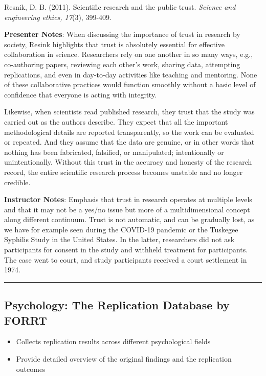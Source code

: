 \documentclass[
  english,
  letterpaper,
  DIV=11,
  numbers=noendperiod]{scrartcl}
\providecommand{\tightlist}{%
  \setlength{\itemsep}{0pt}\setlength{\parskip}{0pt}}
\begin{document}
Resnik, D. B. (2011). Scientific research and the public trust.
\emph{Science and engineering ethics, 17}(3), 399-409.

\textbf{Presenter Notes}: When discussing the importance of trust in
research by society, Resink highlights that trust is absolutely
essential for effective collaboration in science. Researchers rely on
one another in so many ways, e.g., co-authoring papers, reviewing each
other's work, sharing data, attempting replications, and even in
day-to-day activities like teaching and mentoring. None of these
collaborative practices would function smoothly without a basic level of
confidence that everyone is acting with integrity.

Likewise, when scientists read published research, they trust that the
study was carried out as the authors describe. They expect that all the
important methodological details are reported transparently, so the work
can be evaluated or repeated. And they assume that the data are genuine,
or in other words that nothing has been fabricated, falsified, or
manipulated; intentionally or unintentionally. Without this trust in the
accuracy and honesty of the research record, the entire scientific
research process becomes unstable and no longer credible.

\textbf{Instructor Notes}: Emphasis that trust in research operates at
multiple levels and that it may not be a yes/no issue but more of a
multidimensional concept along different continuum. Trust is not
automatic, and can be gradually lost, as we have for example seen during
the COVID-19 pandemic or the Tuskegee Syphilis Study in the United
States. In the latter, researchers did not ask participants for consent
in the study and withheld treatment for participants. The case went to
court, and study participants received a court settlement in 1974.

\begin{center}\rule{0.5\linewidth}{0.5pt}\end{center}

\subsection{Psychology: The Replication Database by
FORRT}\label{psychology-the-replication-database-by-forrt}

\begin{itemize}
\tightlist
\item
  Collects replication results across different psychological fields
\item
  Provide detailed overview of the original findings and the replication
  outcomes
\end{itemize}
\end{document}
